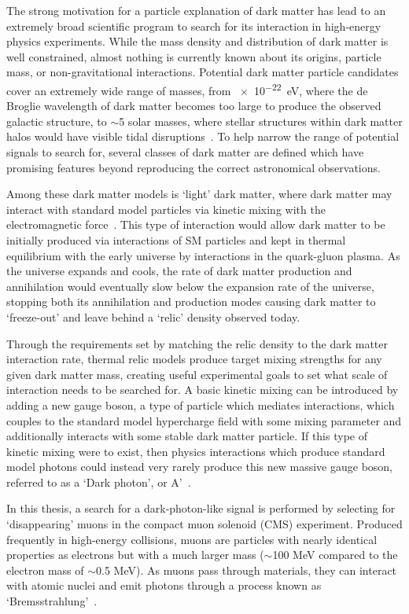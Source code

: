 The strong motivation for a particle explanation of dark matter has lead to an extremely broad scientific program to search for its interaction in high-energy physics experiments. 
While the mass density and distribution of dark matter is well constrained, almost nothing is currently known about its origins, particle mass, or non-gravitational interactions.
Potential dark matter particle candidates cover an extremely wide range of masses, from \SI{e-22}{\eV}, where the de Broglie wavelength of dark matter becomes too large to produce the observed galactic structure, to $\sim$5 solar masses, where stellar structures within dark matter halos would have visible tidal disruptions~\cite{rodriguez_2014}.
To help narrow the range of potential signals to search for, several classes of dark matter are defined which have promising features beyond reproducing the correct astronomical observations. 

Among these dark matter models is `light' dark matter, where dark matter may interact with standard model particles via kinetic mixing with the electromagnetic force~\cite{darkSectors}. 
This type of interaction would allow dark matter to be initially produced via interactions of SM particles and kept in thermal equilibrium with the early universe by interactions in the quark-gluon plasma.
As the universe expands and cools, the rate of dark matter production and annihilation would eventually slow below the expansion rate of the universe, stopping both its annihilation and production modes causing dark matter to `freeze-out' and leave behind a `relic' density observed today.

Through the requirements set by matching the relic density to the dark matter interaction rate, thermal relic models produce target mixing strengths for any given dark matter mass, creating useful experimental goals to set what scale of interaction needs to be searched for.
A basic kinetic mixing can be introduced by adding a new gauge boson, a type of particle which mediates interactions, which couples to the standard model hypercharge field with some mixing parameter and additionally interacts with some stable dark matter particle.
If this type of kinetic mixing were to exist, then physics interactions which produce standard model photons could instead very rarely produce this new massive gauge boson, referred to as a `Dark photon', or A'~\cite{Bauer_2018}. 

In this thesis, a search for a dark-photon-like signal is performed by selecting for `disappearing' muons in the compact muon solenoid (CMS) experiment. 
Produced frequently in high-energy collisions, muons are particles with nearly identical properties as electrons but with a much larger mass ($\sim$100 MeV compared to the electron mass of $\sim$0.5 MeV).
As muons pass through materials, they can interact with atomic nuclei and emit photons through a process known as `Bremsstrahlung'~\cite{tsai_1974}.

